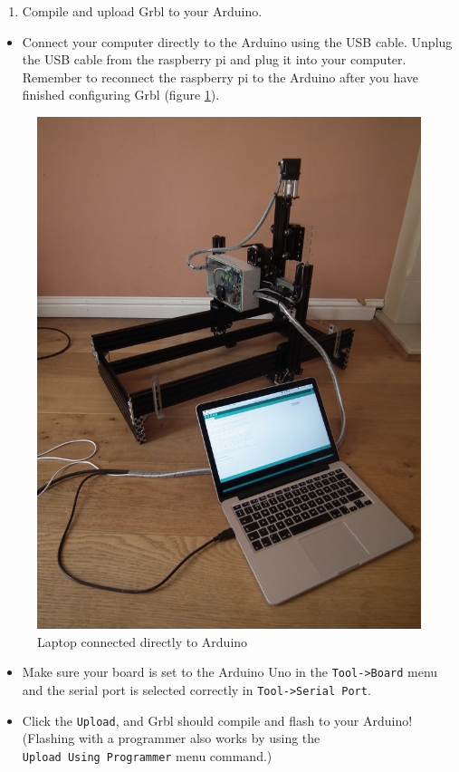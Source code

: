 \documentclass[]{book}
\providecommand{\tightlist}{%
  \setlength{\itemsep}{0pt}\setlength{\parskip}{0pt}}
\theoremstyle{definition}
\theoremstyle{definition}
\theoremstyle{remark}
\begin{document}
\begin{enumerate}
\def\labelenumi{\arabic{enumi}.}
\setcounter{enumi}{4}
\tightlist
\item
  Compile and upload Grbl to your Arduino.
\end{enumerate}

\begin{itemize}
\tightlist
\item
  Connect your computer directly to the Arduino using the USB cable.
  Unplug the USB cable from the raspberry pi and plug it into your
  computer. Remember to reconnect the raspberry pi to the Arduino after
  you have finished configuring Grbl (figure \ref{fig:laptop2arduino}).
\end{itemize}

\begin{figure}

{\centering \includegraphics[width=0.75\linewidth]{images/laptop_connected_to_arduino} 

}

\caption{Laptop connected directly to Arduino}\label{fig:laptop2arduino}
\end{figure}

\begin{itemize}
\tightlist
\item
  Make sure your board is set to the Arduino Uno in the
  \texttt{Tool-\textgreater{}Board} menu and the serial port is selected
  correctly in \texttt{Tool-\textgreater{}Serial\ Port}.
\item
  Click the \texttt{Upload}, and Grbl should compile and flash to your
  Arduino! (Flashing with a programmer also works by using the
  \texttt{Upload\ Using\ Programmer} menu command.)
\end{itemize}
\end{document}

